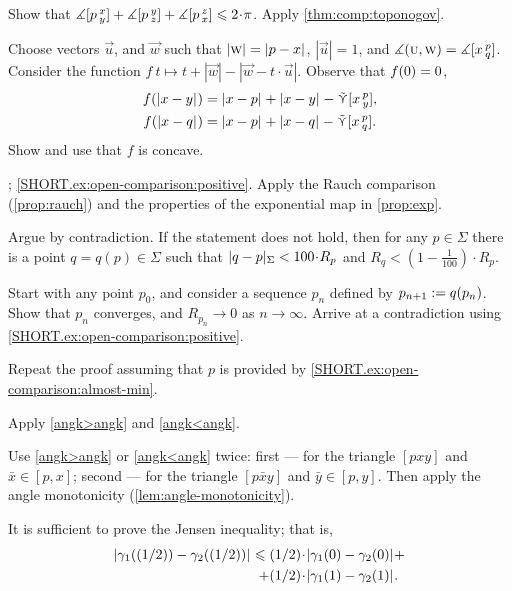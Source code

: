 Show that 
$\measuredangle\hinge pxy+\measuredangle\hinge pyz+\measuredangle\hinge pzx\le2\cdot \pi$.
Apply \ref{thm:comp:toponogov}.

Choose vectors $\vec u$, and $\vec w$ 
such that $|\vec w|\z=\dist{p}{x}{}$, $|\vec u|=1$, and $\measuredangle(\text{\sc{u}},\text{\sc{w}})=\measuredangle[x\,{}^{p}_{q}]$.
Consider the function
$f\:t\mapsto t+|\vec w|-|\vec w-t\cdot \vec u|$.
Observe that $f(0)\z=0$,
\begin{align*}
f(\dist{x}{y}{})&=\dist{x}{p}{}+\dist{x}{y}{}-\side\hinge xpy,
\\
f(\dist{x}{q}{})&=\dist{x}{p}{}+\dist{x}{q}{}-\side\hinge xpq.
\end{align*}
Show and use that $f$ is concave.

\parbf{\ref{ex:open-comparison}}; \ref{SHORT.ex:open-comparison:positive}.
Apply the Rauch comparison (\ref{prop:rauch}) and the properties of the exponential map in \ref{prop:exp}.

 Argue by contradiction.
If the statement does not hold, then for any $p\in\Sigma$ there is a point $q=q(p)\in \Sigma$ such that 
$\dist{q}{p}\Sigma<100\cdot R_p$
and
$R_q<(1-\tfrac1{100})\cdot R_p$.

Start with any point $p_0$, and consider a sequence $p_n$ defined by $p_{n+1}\z\df q(p_n)$.
Show that $p_n$ converges, and $R_{p_n}\to 0$ as $n\to\infty$.
Arrive at a contradiction using \ref{SHORT.ex:open-comparison:positive}.

 Repeat the proof assuming that $p$ is provided by \ref{SHORT.ex:open-comparison:almost-min}.

Apply \ref{angk>angk} and \ref{angk<angk}.

 Use \ref{angk>angk} or \ref{angk<angk} twice:
first --- for the triangle $[pxy]$ and $\bar x\in [p,x]$;
second --- for the triangle $[p\bar xy]$ and $\bar y\in [p,y]$.
Then apply the angle monotonicity (\ref{lem:angle-monotonicity}).

It is sufficient to prove the Jensen inequality;
that is, 
\begin{align*}
\dist{\gamma_1(\tfrac12)}{\gamma_2(\tfrac12)}{}
\le
\tfrac12\cdot&\dist{\gamma_1(0)}{\gamma_2(0)}{}
+
\\
+
\tfrac12\cdot&\dist{\gamma_1(1)}{\gamma_2(1)}{}.
\end{align*}


